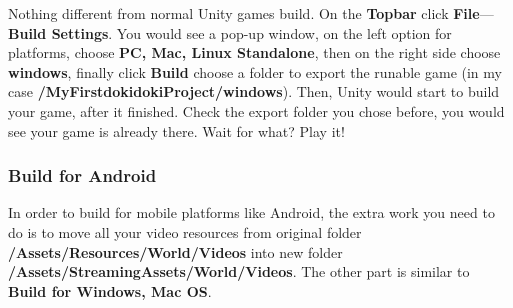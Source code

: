 Nothing different from normal Unity games build. On the \textbf{Topbar} click \textbf{File}---\textbf{Build Settings}. You would see a pop-up window, on the left option for platforms, choose \textbf{PC, Mac, Linux Standalone}, then on the right side choose \textbf{windows}, finally click \textbf{Build} choose a folder to export the runable game (in my case \textbf{/MyFirstdokidokiProject/windows}). Then, Unity would start to build your game, after it finished. Check the export folder you chose before, you would see your game is already there. Wait for what? Play it!

\subsubsection{Build for Android}

In order to build for mobile platforms like Android, the extra work you need to do is to move all your video resources from original folder \textbf{/Assets/Resources/World/Videos} into new folder \textbf{/Assets/StreamingAssets/World/Videos}. The other part is similar to \textbf{Build for Windows, Mac OS}.
